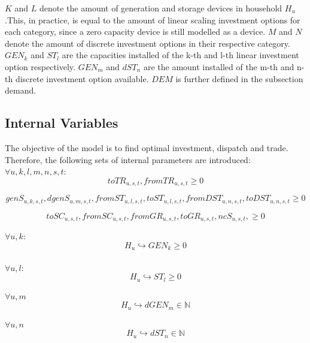 \documentclass[
	11pt,								%
	DIV10,								%
	a4paper,         					%
	oneside,							%
	headheight=20pt,					%
	footheight=20pt,					%
    parskip=full,						%
    listof=totoc,						%
	bibliography=totoc,					%
	index=totoc,						%
]{scrartcl}
\begin{document}
$K$ and $L$ denote the amount of generation and storage devices in household $H_u$.This, in practice, is equal to the amount of linear scaling investment options for each category, since a zero capacity device is still modelled as a device. $M$ and $N$ denote the amount of discrete investment options in their respective category. $GEN_k$ and $ST_l$ are the capacities installed of the k-th and l-th linear investment option respectively. $GEN_m$ and $dST_n$ are the amount installed of the m-th and n-th discrete investment option available. $DEM$ is further defined in the subsection demand.





\subsection{Internal Variables}
The objective of the model is to find optimal investment, dispatch and trade. Therefore, the following sets of internal parameters are introduced:
	\\
	$\forall u,k,l,m,n,s,t$:
	\\
	\begin{equation}
		toTR_{u,s,t}, fromTR_{u,s,t} \geq 0
	\end{equation}
	
	\begin{equation}
		genS_{u,k,s,t}, dgenS_{u,m,s,t}, fromST_{u,l,s,t}, toST_{u,l,s,t}, fromDST_{u,n,s,t}, toDST_{u,n,s,t} \geq 0
	\end{equation}
	
	\begin{equation}
		toSC_{u,s,t}, fromSC_{u,s,t}, fromGR_{u,s,t}, toGR_{u,s,t}, ncS_{u,s,t},  \geq 0
	\end{equation}
	
	
	$\forall u,k$:
	\begin{equation}
		H_u\hookrightarrow GEN_k \geq 0
	\end{equation}
	\\
	$\forall u,l$:
	\begin{equation}
		H_u\hookrightarrow  ST_l \geq 0
	\end{equation}
	
	$\forall u,m$
	\begin{equation}
		H_u\hookrightarrow d GEN_m \in \mathbb{N}
	\end{equation}
	
	$\forall u,n$
	\begin{equation}
		H_u\hookrightarrow d ST_n \in \mathbb{N}
	\end{equation}
\end{document}
